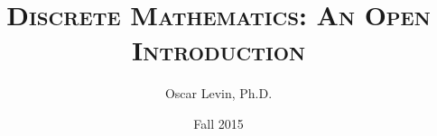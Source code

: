 \def\course{Math 228}




\title{\textsc{Discrete Mathematics: An Open Introduction}
}




\author{Oscar Levin, Ph.D.}

\date{Fall 2015}

\begin{titlingpage*}

\maketitle

\end{titlingpage*}


  

\tableofcontents


